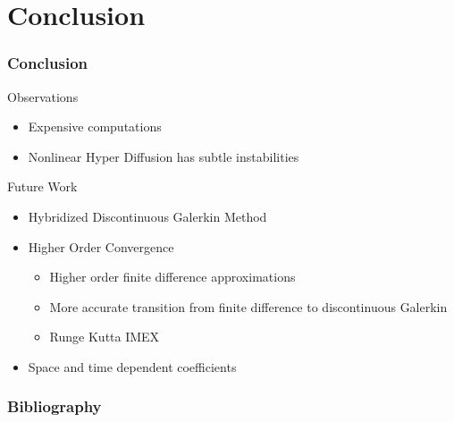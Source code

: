 \documentclass[10pt]{beamer}
\begin{document}
  \section{Conclusion}
    \begin{frame}
      \frametitle{Conclusion}
      Observations
      \begin{itemize}
        \item Expensive computations
        \item Nonlinear Hyper Diffusion has subtle instabilities
      \end{itemize}
      Future Work
      \begin{itemize}
        \item Hybridized Discontinuous Galerkin Method
        \item Higher Order Convergence
          \begin{itemize}
            \item Higher order finite difference approximations
            \item More accurate transition from finite difference to discontinuous Galerkin
            \item Runge Kutta IMEX
          \end{itemize}
        \item Space and time dependent coefficients
      \end{itemize}
    \end{frame}

    \begin{frame}
      \frametitle{Bibliography}
      \nocite{*}
      \printbibliography{}
    \end{frame}
\end{document}
